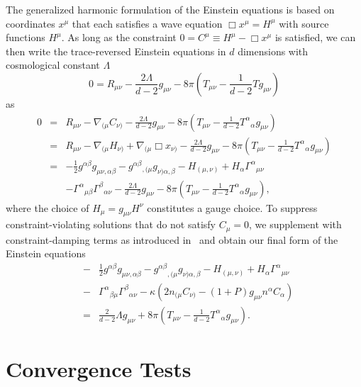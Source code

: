 \documentclass[12pt]{iopart}
\begin{document}
The generalized harmonic formulation of the Einstein equations is based on coordinates $x^\mu$ that each satisfies a wave equation $\Box x^{\mu}=H^\mu$ with source functions $H^\mu$.
As long as the constraint $0=C^\mu \equiv H^\mu-\Box x^\mu$ is satisfied, we can then write the trace-reversed Einstein equations in $d$ dimensions with cosmological constant $\Lambda$
\begin{equation}
0=R_{\mu\nu} - \frac{2\Lambda}{d-2} g_{\mu\nu} - 8\pi\left( T_{\mu\nu} - \frac{1}{d-2} T g_{\mu\nu} \right)
\end{equation}
as
\begin{eqnarray}
0
&=& R_{\mu\nu} - \nabla_{(\mu} C_{\nu)} - \frac{2\Lambda}{d-2} g_{\mu\nu} - 8\pi\left( T_{\mu\nu} - \frac{1}{d-2} {T^\alpha}_\alpha g_{\mu\nu} \right) \nonumber \\
&=& R_{\mu\nu} - \nabla_{(\mu} H_{\nu)} + \nabla_{(\mu} \Box{x}_{\nu)} - \frac{2\Lambda}{d-2} g_{\mu\nu} - 8\pi\left( T_{\mu\nu} - \frac{1}{d-2} {T^\alpha}_\alpha g_{\mu\nu} \right) \nonumber \\
&=& -\frac{1}{2} g^{\alpha\beta} g_{\mu\nu,\alpha\beta} - g^{\alpha\beta}{}_{,(\mu}g_{\nu)\alpha,\beta} - H_{(\mu,\nu)} + H_\alpha \Gamma^\alpha{}_{\mu\nu} \nonumber \\
&&- \Gamma^\alpha{}_{\mu\beta}\Gamma^\beta{}_{\alpha\nu} - \frac{2\Lambda}{d-2} g_{\mu\nu} - 8\pi\left( T_{\mu\nu} - \frac{1}{d-2} {T^\alpha}_\alpha g_{\mu\nu} \right) \nonumber,
\end{eqnarray}
where the choice of $H_\mu = g_{\mu\nu} H^\nu$ constitutes a gauge choice. 
To suppress constraint-violating solutions that do not satisfy $C_\mu=0$, we supplement with constraint-damping terms as introduced in~\cite{Gundlach:2005eh} and obtain our final form of the Einstein equations
\begin{eqnarray}\label{eqn:efe_gh_modified}
&-& \frac{1}{2} g^{\alpha \beta} g_{\mu \nu, \alpha \beta} - 
{g^{\alpha \beta}}_{,(\mu} g_{\nu) \alpha, \beta} - H_{(\mu, \nu)} + H_\alpha {\Gamma^\alpha}_{\mu \nu} \nonumber \\
&-& {\Gamma^\alpha}_{\beta \mu} {\Gamma^\beta}_{\alpha \nu} - \kappa \left( 2 n_{(\mu} C_{\nu)} - (1+P) g_{\mu \nu} n^\alpha 
C_\alpha \right) \nonumber \\
&=&   \frac{2}{d-2} \Lambda g_{\mu \nu} + 8\pi \left( T_{\mu \nu} - 
\frac{1}{d-2} {T^\alpha}_\alpha g_{\mu \nu} \right).
\end{eqnarray}

\section{Convergence Tests}
\end{document}
